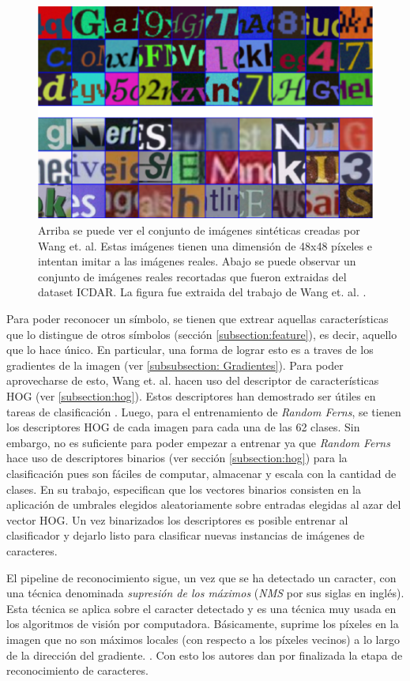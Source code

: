		\begin{figure}[htbp]
			\centering
			\includegraphics[scale=0.5]{img/synth_data_wang.png}
			\caption[Datos sintéticos Wang]{Arriba se puede ver el conjunto de imágenes sintéticas creadas por Wang et. al. Estas imágenes tienen una dimensión de 48x48 píxeles e intentan imitar a las imágenes reales. Abajo se puede observar un conjunto de imágenes reales recortadas que  fueron extraidas del dataset ICDAR. La figura fue extraida del trabajo de Wang et. al. \cite{wang}.}
			\label{fig: Datos sinteticos Wang}
		\end{figure}
	
	Para poder reconocer un símbolo, se tienen que extrear aquellas características que lo distingue de otros símbolos (sección \ref{subsection:feature}), es decir, aquello que lo hace único. En particular, una forma de lograr esto es a traves de los gradientes de la imagen (ver \ref{subsubsection: Gradientes}). Para poder aprovecharse de esto, Wang et. al. hacen uso del descriptor de características HOG (ver \ref{subsection:hog}). Estos descriptores han demostrado ser útiles en tareas de clasificación \cite{DT05}. Luego, para el entrenamiento de \textit{Random Ferns}, se tienen los descriptores HOG de cada imagen para cada una de las 62 clases. Sin embargo, no es suficiente para poder empezar a entrenar ya que \textit{Random Ferns} hace uso de descriptores binarios (ver sección \ref{subsection:hog}) para la clasificación pues son fáciles de computar, almacenar y escala con la cantidad de clases. En su trabajo, especifican que los vectores binarios consisten en la aplicación de umbrales elegidos aleatoriamente sobre entradas elegidas al azar del vector HOG. Un vez binarizados los descriptores es posible entrenar al clasificador y dejarlo listo para clasificar nuevas instancias de imágenes de caracteres.
	
	El pipeline de reconocimiento sigue, un vez que se ha detectado un caracter, con una técnica denominada \textit{supresión de los máximos} (\textit{NMS} por sus siglas en inglés). Esta técnica se aplica sobre el caracter detectado y es una técnica muy usada en los algoritmos de visión por computadora. Básicamente, suprime los píxeles en la imagen que no son máximos locales (con respecto a los píxeles vecinos) a lo largo de la dirección del gradiente. . Con esto los autores dan por finalizada la etapa de reconocimiento de caracteres.


